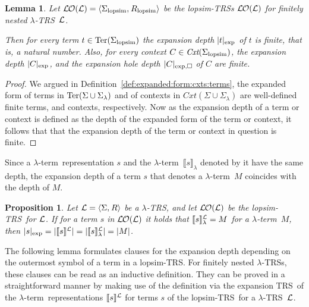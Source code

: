\documentclass[
submission
]{dmtcs-episciences-tampered}
\newcommand{\fap}[2]{#1({#2})}
\newcommand{\indap}[2]{#1 _{#2}}
\newcommand{\nb}{\nobreakdash}
\newcommand{\nf}{\normalfont}
\newcommand{\tuple}[1]{\langle #1 \rangle}
\newcommand{\tuplespace}{\hspace*{0.5pt}}
\newcommand{\pair}[2]{\tuple{#1, \tuplespace #2}}
\newcommand{\ater}{s}
\newcommand{\bter}{t}
\newcommand{\asig}{\Sigma}
\newcommand{\asiglopsim}{\indap{\asig}{\scriptlopsim}}
\newcommand{\asiglambda}{\indap{\asig}{\lambda}}
\newcommand{\arules}{R}
\newcommand{\ruleslopsim}{\indap{\arules}{\scriptlopsim}}
\newcommand{\alTRS}{{\cal L}}
\newcommand{\TRS}{TRS}
\newcommand{\stermsover}{\text{\nf Ter}}
\newcommand{\termsover}{\fap{\stermsover}}
\newcommand{\scontextsover}{\textit{Cxt}}
\newcommand{\contextsover}{\fap{\scontextsover}}
\newcommand{\acxt}{C}
\newcommand{\hole}{\Box}
\newcommand{\sdepth}{\text{\nf d}}
\newcommand{\depth}[1]{\lvert{#1}\rvert} \newcommand{\depthbig}[1]{\big\lvert{#1}\big\rvert} \newcommand{\sudepth}{\indap{\sdepth}{\text{\nf u}}}
\newcommand{\expdepth}[1]{\lvert{#1}\rvert_{\scriptexp}}
\newcommand{\expholedepth}[1]{\lvert{#1}\rvert_{\scriptexp,\hole}}
\newcommand{\denlterrepwrt}[2]{\llbracket{#2}\rrbracket^{#1}}
\newcommand{\denlterwrt}[2]{\llbracket{#2}\rrbracket^{#1}_{\sslabs}}
\newcommand{\denlter}[1]{\llbracket{#1}\rrbracket_{\sslabs}}
\newcommand{\lopsimTRS}{lopsim-TRS}
\newcommand{\alter}{M}
\newcommand{\sslabs}{\lambda}
\newcommand{\scriptlopsim}{\text{\nf lopsim}}
\newcommand{\scriptexp}{\text{\nf exp}}
\newcommand{\lambdaterm}{$\lambda$\nb-term}
\newcommand{\lTRS}{$\lambda$\hspace*{-0.5pt}\nb-\hspace*{-0.5pt}\TRS}
\newcommand{\lTRSs}{\lTRS{s}}
\theoremstyle{plain}
\newtheorem{lemma}[theorem]{Lemma}
\newtheorem{proposition}[theorem]{Proposition}
\theoremstyle{definition}
\begin{document}
\begin{lemma}\label{lem:finite:expdepth:fin:nested}
  Let $\lopsimTRSwrt{\alTRS} = \pair{\asiglopsim}{\ruleslopsim}$ be the \lopsimTRS{s} $\lopsimTRSwrt{\alTRS}$ for finitely nested \lTRS~$\alTRS$.
  
  Then for every term $\bter\in\termsover{\asiglopsim}$ the expansion depth $\expdepth{\bter}$ of $\bter$ is finite, that is, a natural number.  
  Also, for every context $\acxt\in\contextsover{\asiglopsim}$,
  the expansion depth $\expdepth{\acxt}$, and the expansion hole depth $\expholedepth{\acxt}$ of $\acxt$ are finite. 
\end{lemma}

\begin{proof}
  We argued in Definition~\ref{def:expanded:form:cxts:terms}, the expanded form of terms in $\termsover{\asig\cup\asiglambda}$
  and of contexts in $\contextsover{\asig\cup\asiglambda}$ are well-defined finite terms, and contexts, respectively.
  Now as the expansion depth of a term or context is defined as the depth of the expanded form of the term or context,
  it follows that that the expansion depth of the term or context in question is finite.
\end{proof}





Since a \lambdaterm\ representation $\ater$ and the \lambdaterm~$\denlter{\ater}$ denoted by it
have the same depth, the expansion depth of a term $\ater$ that denotes a \lambdaterm~$\alter$
coincides with the depth of $\alter$.

\begin{proposition}\label{prop:expdepth:lterrep:lter}
  Let $\alTRS = \pair{\asig}{\arules}$ be a \lTRS, 
  and let $\lopsimTRSwrt{\alTRS}$ be the \lopsimTRS\ for $\alTRS$. 
  If for a term $\ater$ in $\lopsimTRSwrt{\alTRS}$
  it holds that $\denlterwrt{\alTRS}{\ater} = \alter$ for a \lambdaterm~$\alter$,
  then $\expdepth{\ater} = \depth{\denlterrepwrt{\alTRS}{\ater}} = \depth{\denlterwrt{\alTRS}{\ater}} = \depth{\alter}$.  
\end{proposition}



The following lemma formulates clauses for the expansion depth
depending on the outermost symbol of a term in a \lopsimTRS. 
For finitely nested \lTRSs, these clauses can be read as an inductive definition. 
They can be proved in a straightforward manner by making use
of the definition  via the expansion \TRS\ of the \lambdaterm\ representations $\denlterrepwrt{\alTRS}{\ater}$
for terms $\ater$ of the \lopsimTRS\ for a \lTRS~$\alTRS$. 
\end{document}

